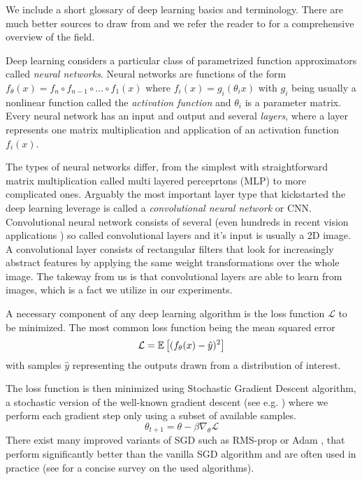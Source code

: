 We include a short glossary of deep learning basics and terminology. There are much better sources to draw from and we refer the reader to \cite{deeplearning multiple} for a comprehensive overview of the field.

Deep learning considers a particular class of parametrized function approximators called \textit{neural networks}. 
Neural networks are functions of the form $f_\theta(x) = f_n \circ f_{n-1} \circ\hdots\circ  f_1(x)$ where $f_i(x) = g_i(\theta_i x)$ with $g_i$ being usually a nonlinear function called the \textit{activation function} and $\theta_i$ is a parameter matrix. Every neural network has an input and output and several \textit{layers}, where a layer represents one matrix multiplication and application of an activation function $f_i(x)$.

The types of neural networks differ, from the simplest with straightforward matrix multiplication called multi layered perceprtons (MLP) to more complicated ones. Arguably the most important layer type that kickstarted the deep learning leverage is called a \textit{convolutional neural network} or CNN. Convolutional neural network consists of several (even hundreds in recent vision applications \cite{...}) so called convolutional layers and it's input is usually a 2D image. A convolutional layer consists of rectangular filters that look for increasingly abstract features by applying the same weight transformations over the whole image. The takeway from us is that convolutional layers are able to learn from images, which is a fact we utilize in our experiments.

A necessary component of any deep learning algorithm is the loss function $\mathcal{L}$ to be minimized. The most common loss function being the mean squared error
\begin{equation*}
\mathcal{L} = \mathbb{E}\left[ {(f_\theta(x) - \hat{y})^2} \right]
\end{equation*}
with samples $\hat{y}$ representing the outputs drawn from a distribution of interest. 

The loss function is then minimized using Stochastic Gradient Descent algorithm, a stochastic version of the well-known gradient descent (see e.g. \citet{boyd2004convex}) where we perform each gradient step only using a subset of available samples. 
\begin{equation}
\theta_{t+1} = \theta - \beta\nabla_\theta \mathcal{L}
\end{equation}
There exist many improved variants of SGD such as RMS-prop \cite{...} or Adam \cite{...}, that perform significantly better than the vanilla SGD algorithm and are often used in practice (see \cite{survey} for a concise survey on the used algorithms).


